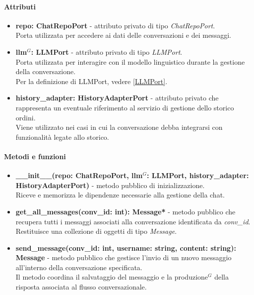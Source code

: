 \paragraph{Attributi}
\begin{itemize}
	\item \textbf{repo: ChatRepoPort} - attributo privato di tipo \textit{ChatRepoPort}.\\
	Porta utilizzata per accedere ai dati delle conversazioni e dei messaggi.
	\item \textbf{llm$^G$: LLMPort} - attributo privato di tipo \textit{LLMPort}.\\
	Porta utilizzata per interagire con il modello linguistico durante la gestione della conversazione.\\
	Per la definizione di LLMPort, vedere \ref{LLMPort}.
	\item \textbf{history\_adapter: HistoryAdapterPort} - attributo privato che rappresenta un eventuale riferimento al servizio di gestione dello storico ordini.\\
	Viene utilizzato nei casi in cui la conversazione debba integrarsi con funzionalit\`a legate allo storico.
\end{itemize}

\paragraph{Metodi e funzioni}
\begin{itemize}
	\item \textbf{\_\_init\_\_(repo: ChatRepoPort, llm$^G$: LLMPort, history\_adapter: HistoryAdapterPort)} - metodo pubblico di inizializzazione.\\
	Riceve e memorizza le dipendenze necessarie alla gestione della chat.
	\item \textbf{get\_all\_messages(conv\_id: int): Message*} - metodo pubblico che recupera tutti i messaggi associati alla conversazione identificata da \textit{conv\_id}.\\
	Restituisce una collezione di oggetti di tipo \textit{Message}.
	\item \textbf{send\_message(conv\_id: int, username: string, content: string): Message} - metodo pubblico che gestisce l'invio di un nuovo messaggio all'interno della conversazione specificata.\\
	Il metodo coordina il salvataggio del messaggio e la produzione$^G$ della risposta associata al flusso conversazionale.
\end{itemize}

